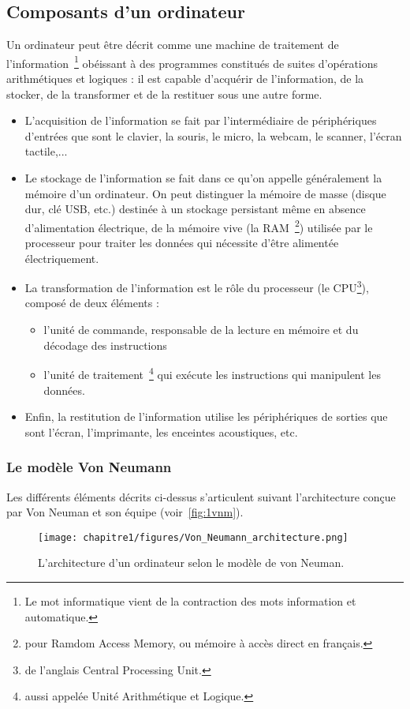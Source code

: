 \subsection{Composants d'un ordinateur}

Un ordinateur peut être décrit comme une machine de traitement de l’information~\footnote{Le mot informatique vient de la contraction des mots information et automatique.} obéissant à des programmes
constitués de suites d’opérations arithmétiques et logiques : il est capable d’acquérir de l’information, de la
stocker, de la transformer et de la restituer sous une autre forme.
\begin{itemize}
    \item L’acquisition de l’information se fait par l’intermédiaire de périphériques d’entrées que sont le clavier, la
souris, le micro, la webcam, le scanner, l’écran tactile,...
\item Le stockage de l’information se fait dans ce qu’on appelle généralement la mémoire d’un ordinateur. On
peut distinguer la mémoire de masse (disque dur, clé USB, etc.) destinée à un stockage persistant même
en absence d’alimentation électrique, de la mémoire vive (la RAM~\footnote{pour Ramdom Access Memory, ou mémoire à accès direct en français.}) utilisée par le processeur pour traiter
les données qui nécessite d’être alimentée électriquement.
\item La transformation de l’information est le rôle du processeur (le CPU\footnote{de l’anglais Central Processing Unit.}), composé de deux éléments :
\begin{itemize}
    \item l’unité de commande, responsable de la lecture en mémoire et du décodage des instructions
    \item l’unité de
traitement~\footnote{aussi appelée Unité Arithmétique et Logique.} qui exécute les instructions qui manipulent les données.
\end{itemize}
\item Enfin, la restitution de l’information utilise les périphériques de sorties que sont l’écran, l’imprimante, les
enceintes acoustiques, etc.
\end{itemize}

\subsubsection{Le modèle Von Neumann}
Les différents éléments décrits ci-dessus s’articulent suivant l’architecture conçue par Von Neuman et son
équipe (voir~\autoref{fig:1vnm}).
\begin{figure}
    \centering
    \texttt{[image: chapitre1/figures/Von\_Neumann\_architecture.png]}
    \caption{L’architecture d’un ordinateur selon le modèle de von Neuman.}
    \label{fig:1vnm}
\end{figure}

